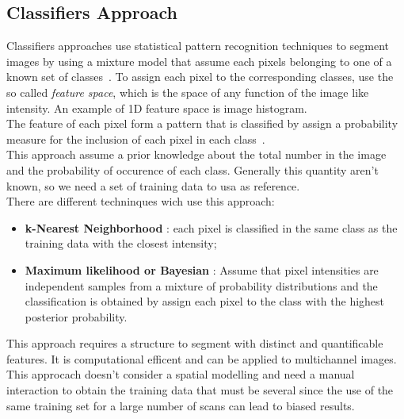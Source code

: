 \documentclass{standalone}
\begin{document}
\subsection{Classifiers Approach}

Classifiers approaches use statistical pattern recognition techniques to segment images by using a mixture model that assume each pixels belonging to one of a known set of classes~\cite{INP:Withey}. To assign each pixel to the corresponding classes, use the so called \emph{feature space}, which is the space of any function of the image like intensity. An example of 1D feature space is image histogram. \\
The feature of each pixel form a pattern that is classified by assign a probability measure for the inclusion of each pixel in each class~\cite{INP:Withey}.\\
This approach assume a prior knowledge about the total number in the image and the probability of occurence of each class. Generally this quantity aren't known, so we need a set of training data to usa as reference. \\
There are different techninques wich use this approach: 
\begin{itemize}

\item \textbf{k-Nearest Neighborhood} : each pixel is classified in the same class as the training data with the closest intensity; 

\item \textbf{Maximum likelihood or Bayesian} : Assume that pixel intensities are independent samples from a mixture of probability distributions and the  classification is obtained by assign each pixel to the class with the highest posterior probability. 
\end{itemize}

This approach requires a structure to segment with distinct and quantificable features. It is computational efficent and can be applied to multichannel images. 
This approcach doesn't consider a spatial modelling and need a manual interaction to obtain the training data that must be several since the use of the same training set for a large number of scans can lead to biased results.  
\end{document}
